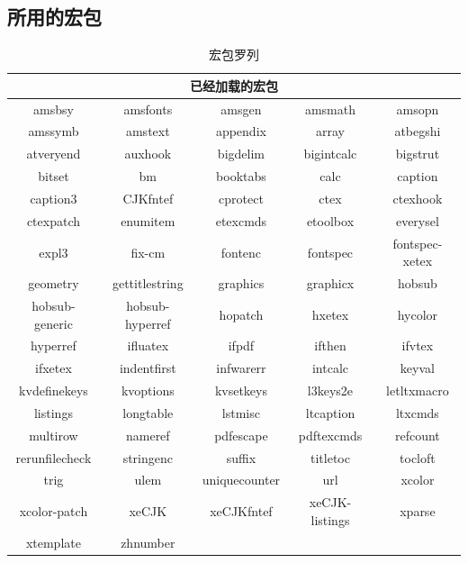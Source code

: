 \documentclass[withoutpreface,bwprint]{cumcmthesis} %
\begin{document}
\begin{appendices}
\section{所用的宏包}
\begin{table}[htbp]
    \centering
    \caption{宏包罗列}
    \begin{tabular}{ccccc}
        \toprule
        \multicolumn{5}{c}{已经加载的宏包} \\
        \midrule
        amsbsy & amsfonts & {amsgen} & {amsmath} & {amsopn} \\
        amssymb & amstext & {appendix} & {array} & {atbegshi} \\
        atveryend & auxhook & {bigdelim} & {bigintcalc} & {bigstrut} \\
        bitset & bm    & {booktabs} & {calc} & {caption} \\
        caption3 & CJKfntef & {cprotect} & {ctex} & {ctexhook} \\
        ctexpatch & enumitem & {etexcmds} & {etoolbox} & {everysel} \\
        expl3 & fix-cm & {fontenc} & {fontspec} & {fontspec-xetex} \\
        geometry & gettitlestring & {graphics} & {graphicx} & {hobsub} \\
        hobsub-generic & hobsub-hyperref & {hopatch} & {hxetex} & {hycolor} \\
        hyperref & ifluatex & {ifpdf} & {ifthen} & {ifvtex} \\
        ifxetex & indentfirst & {infwarerr} & {intcalc} & {keyval} \\
        kvdefinekeys & kvoptions & {kvsetkeys} & {l3keys2e} & {letltxmacro} \\
        listings & longtable & {lstmisc} & {ltcaption} & {ltxcmds} \\
        multirow & nameref & {pdfescape} & {pdftexcmds} & {refcount} \\
        rerunfilecheck & stringenc & {suffix} & {titletoc} & {tocloft} \\
        trig  & ulem  & {uniquecounter} & {url} & {xcolor} \\
        xcolor-patch & xeCJK & {xeCJKfntef} & {xeCJK-listings} & {xparse} \\
        xtemplate & zhnumber &       &       &  \\
        \bottomrule
    \end{tabular}%
    \label{tab:addlabel}%
\end{table}%

\end{appendices}
\end{document}

